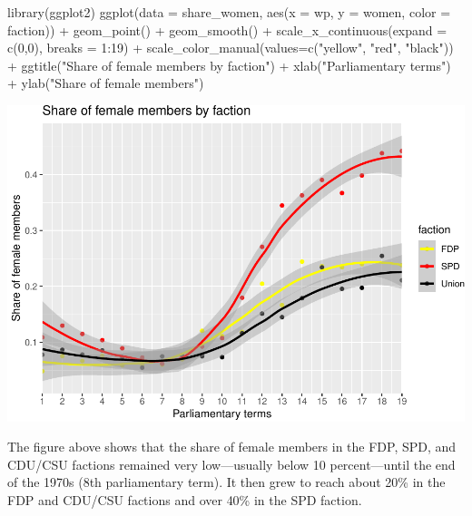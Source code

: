 \documentclass[12pt]{article}
\newenvironment{Shaded}{\begin{snugshade}}{\end{snugshade}}
\newcommand{\AttributeTok}[1]{\textcolor[rgb]{0.77,0.63,0.00}{#1}}
\newcommand{\DecValTok}[1]{\textcolor[rgb]{0.00,0.00,0.81}{#1}}
\newcommand{\FunctionTok}[1]{\textcolor[rgb]{0.00,0.00,0.00}{#1}}
\newcommand{\NormalTok}[1]{#1}
\newcommand{\SpecialCharTok}[1]{\textcolor[rgb]{0.00,0.00,0.00}{#1}}
\newcommand{\StringTok}[1]{\textcolor[rgb]{0.31,0.60,0.02}{#1}}
\begin{document}
\begin{Shaded}
\begin{Highlighting}[]
\FunctionTok{library}\NormalTok{(ggplot2)}
\FunctionTok{ggplot}\NormalTok{(}\AttributeTok{data =}\NormalTok{ share\_women, }\FunctionTok{aes}\NormalTok{(}\AttributeTok{x =}\NormalTok{ wp, }\AttributeTok{y =}\NormalTok{ women, }\AttributeTok{color =}\NormalTok{ faction)) }\SpecialCharTok{+}
  \FunctionTok{geom\_point}\NormalTok{() }\SpecialCharTok{+}
  \FunctionTok{geom\_smooth}\NormalTok{() }\SpecialCharTok{+}
  \FunctionTok{scale\_x\_continuous}\NormalTok{(}\AttributeTok{expand =} \FunctionTok{c}\NormalTok{(}\DecValTok{0}\NormalTok{,}\DecValTok{0}\NormalTok{), }\AttributeTok{breaks =} \DecValTok{1}\SpecialCharTok{:}\DecValTok{19}\NormalTok{) }\SpecialCharTok{+}
  \FunctionTok{scale\_color\_manual}\NormalTok{(}\AttributeTok{values=}\FunctionTok{c}\NormalTok{(}\StringTok{"yellow"}\NormalTok{, }\StringTok{"red"}\NormalTok{, }\StringTok{"black"}\NormalTok{)) }\SpecialCharTok{+}
  \FunctionTok{ggtitle}\NormalTok{(}\StringTok{"Share of female members by faction"}\NormalTok{) }\SpecialCharTok{+}
  \FunctionTok{xlab}\NormalTok{(}\StringTok{"Parliamentary terms"}\NormalTok{) }\SpecialCharTok{+} 
  \FunctionTok{ylab}\NormalTok{(}\StringTok{"Share of female members"}\NormalTok{)}
\end{Highlighting}
\end{Shaded}

\includegraphics{paper_files/figure-latex/women_graph-1.pdf}

The figure above shows that the share of female members in the FDP, SPD,
and CDU/CSU factions remained very low---usually below 10
percent---until the end of the 1970s (8th parliamentary term). It then
grew to reach about 20\% in the FDP and CDU/CSU factions and over 40\%
in the SPD faction.
\end{document}
